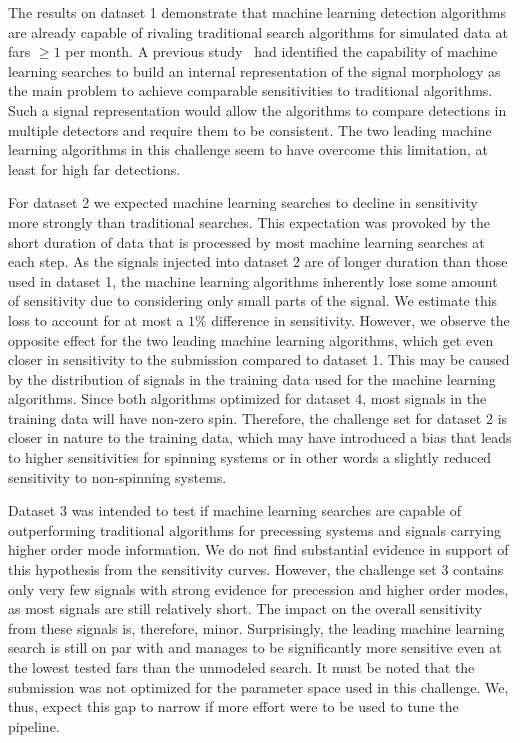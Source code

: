 The results on dataset 1 demonstrate that machine learning detection algorithms are already capable of rivaling traditional search algorithms for simulated data at \acrshort{far}s $\geq 1$ per month. A previous study~\cite{Schafer:2021cml} had identified the capability of machine learning searches to build an internal representation of the signal morphology as the main problem to achieve comparable sensitivities to traditional algorithms. Such a signal representation would allow the algorithms to compare detections in multiple detectors and require them to be consistent. The two leading machine learning algorithms in this challenge seem to have overcome this limitation, at least for high \acrshort{far} detections.

For dataset 2 we expected machine learning searches to decline in sensitivity more strongly than traditional searches. This expectation was provoked by the short duration of data that is processed by most machine learning searches at each step. As the signals injected into dataset 2 are of longer duration than those used in dataset 1, the machine learning algorithms inherently lose some amount of sensitivity due to considering only small parts of the signal. We estimate this loss to account for at most a $1\%$ difference in sensitivity. However, we observe the opposite effect for the two leading machine learning algorithms, which get even closer in sensitivity to the \pycbc submission compared to dataset 1. This may be caused by the distribution of signals in the training data used for the machine learning algorithms. Since both algorithms optimized for dataset 4, most signals in the training data will have non-zero spin. Therefore, the challenge set for dataset 2 is closer in nature to the training data, which may have introduced a bias that leads to higher sensitivities for spinning systems or in other words a slightly reduced sensitivity to non-spinning systems.

Dataset 3 was intended to test if machine learning searches are capable of outperforming traditional algorithms for precessing systems and signals carrying higher order mode information. We do not find substantial evidence in support of this hypothesis from the sensitivity curves. However, the challenge set 3 contains only very few signals with strong evidence for precession and higher order modes, as most signals are still relatively short. The impact on the overall sensitivity from these signals is, therefore, minor. Surprisingly, the leading machine learning search is still on par with \pycbc and manages to be significantly more sensitive even at the lowest tested \acrshort{far}s than the unmodeled \cwb search. It must be noted that the \cwb submission was not optimized for the parameter space used in this challenge. We, thus, expect this gap to narrow if more effort were to be used to tune the \cwb pipeline.

